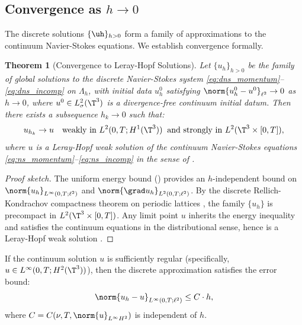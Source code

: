 \documentclass[12pt, a4paper]{article}
\theoremstyle{plain}
\newtheorem{theorem}{Theorem}[section]
\theoremstyle{definition}
\begin{document}
\subsection{Convergence as $h \to 0$}

The discrete solutions $\{\uh\}_{h>0}$ form a family of approximations to the
continuum Navier-Stokes equations. We establish convergence formally.

\begin{theorem}[Convergence to Leray-Hopf Solutions]\label{thm:convergence}
  Let $\{u_h\}_{h>0}$ be the family of global solutions to the discrete
  Navier-Stokes system \eqref{eq:dns_momentum}--\eqref{eq:dns_incomp} on
  $\Lambda_h$, with initial data $u_h^0$ satisfying
  $\norm{u_h^0 - u^0}_{\ell^2} \to 0$ as $h \to 0$, where
  $u^0 \in L^2_\sigma(\T^3)$ is a divergence-free continuum initial datum.
  Then there exists a subsequence $h_k \to 0$ such that:
  \begin{equation}\label{eq:convergence}
    u_{h_k} \to u \quad \text{weakly in } L^2(0,T; H^1(\T^3))
    \;\; \text{and strongly in } L^2(\T^3 \times [0,T]),
  \end{equation}
  where $u$ is a Leray-Hopf weak solution of the continuum Navier-Stokes
  equations \eqref{eq:ns_momentum}--\eqref{eq:ns_incomp} in the sense
  of \citet{Leray1934}.
\end{theorem}

\begin{proof}[Proof sketch]
  The uniform energy bound () provides an
  $h$-independent bound on $\norm{u_h}_{L^\infty(0,T;\ell^2)}$ and
  $\norm{\grad u_h}_{L^2(0,T;\ell^2)}$. By the discrete Rellich-Kondrachov
  compactness theorem on periodic lattices \citep{LeVeque2007}, the family
  $\{u_h\}$ is precompact in $L^2(\T^3 \times [0,T])$. Any limit point
  $u$ inherits the energy inequality and satisfies the continuum equations
  in the distributional sense, hence is a Leray-Hopf weak solution
  \citep{Temam2001, ConstantinFoias1988}.
\end{proof}

\begin{proposition}\label{prop:error}
  If the continuum solution $u$ is sufficiently regular (specifically,
  $u \in L^\infty(0,T; H^2(\T^3))$), then the discrete approximation
  satisfies the error bound:
  \begin{equation}\label{eq:error_rate}
    \norm{u_h - u}_{L^\infty(0,T;\ell^2)} \leq C \cdot h,
  \end{equation}
  where $C = C(\nu, T, \norm{u}_{L^\infty H^2})$ is independent of $h$.
\end{proposition}
\end{document}
